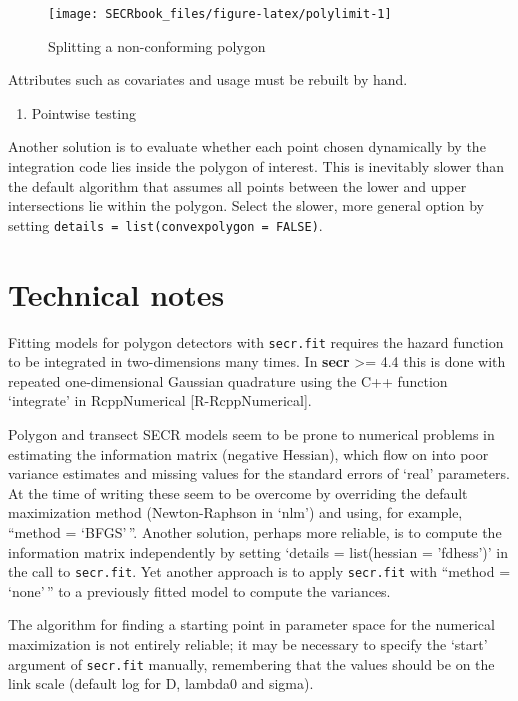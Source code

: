 \documentclass[
]{book}
\providecommand{\tightlist}{%
  \setlength{\itemsep}{0pt}\setlength{\parskip}{0pt}}
\begin{document}
\begin{figure}
\texttt{[image: SECRbook\_files/figure-latex/polylimit-1]} \caption{Splitting a non-conforming polygon}\label{fig:polylimit}
\end{figure}

Attributes such as covariates and usage must be rebuilt by hand.

\begin{enumerate}
\def\labelenumi{\arabic{enumi}.}
\setcounter{enumi}{1}
\tightlist
\item
  Pointwise testing
\end{enumerate}

Another solution is to evaluate whether each point chosen dynamically by the integration code lies inside the polygon of interest. This is inevitably slower than the default algorithm that assumes all points between the lower and upper intersections lie within the polygon. Select the slower, more general option by setting \texttt{details\ =\ list(convexpolygon\ =\ FALSE)}.

\section{Technical notes}\label{technotes}

Fitting models for polygon detectors with \texttt{secr.fit} requires the hazard function to be integrated in two-dimensions many
times. In \textbf{secr} \textgreater= 4.4 this is done with repeated one-dimensional Gaussian quadrature using the C++ function `integrate' in RcppNumerical {[}R-RcppNumerical{]}.

Polygon and transect SECR models seem to be prone to numerical problems in estimating the information matrix (negative Hessian), which flow on into poor variance estimates and missing values for the standard errors of `real' parameters. At the time of writing these seem to be overcome by overriding the default maximization method (Newton-Raphson in `nlm') and using, for example, ``method = `BFGS'\,''. Another solution, perhaps more reliable, is to compute the information matrix independently by setting `details = list(hessian = 'fdhess')' in the call to \texttt{secr.fit}. Yet another approach is to apply \texttt{secr.fit} with ``method = `none'\,'' to a previously fitted model to compute the variances.

The algorithm for finding a starting point in parameter space for the numerical maximization is not entirely reliable; it may be necessary to specify the `start' argument of \texttt{secr.fit} manually, remembering that the values should be on the link scale (default log for D, lambda0 and sigma).
\end{document}
